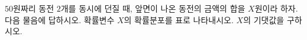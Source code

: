 $50$원짜리 동전 $2$개를 동시에 던질 때, 앞면이 나온 동전의 금액의 합을 $X$원이라 하자. 다음 물음에 답하시오.
 확률변수 $X$의 확률분포를 표로 나타내시오.
 $X$의 기댓값을 구하시오.
